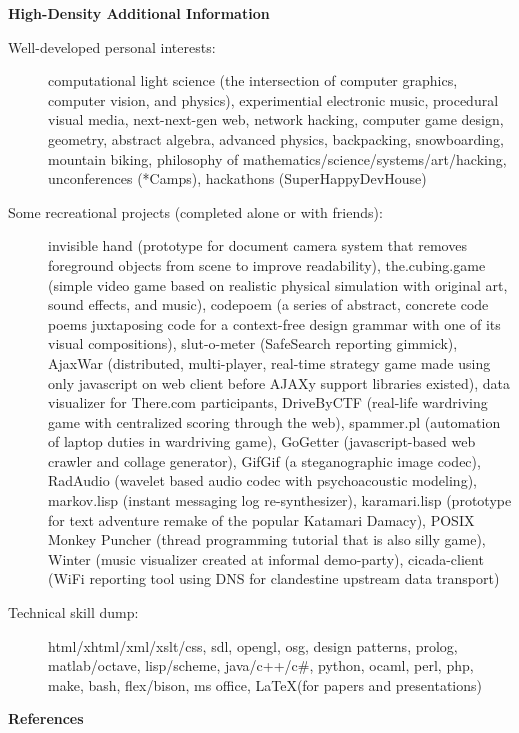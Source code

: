 \documentclass[10pt]{article}
\begin{document}
\newpage
{\large \textbf{High-Density Additional Information}}
\begin{description}
\item [Well-developed personal interests:] {\small computational light science (the intersection of computer graphics, computer vision, and physics), experimential electronic music, procedural visual media, next-next-gen web, network hacking, computer game design, geometry, abstract algebra, advanced physics, backpacking, snowboarding, mountain biking, philosophy of mathematics/science/systems/art/hacking, unconferences (*Camps), hackathons (SuperHappyDevHouse)}
\item [Some recreational projects (completed alone or with friends):] {\small invisible hand (prototype for document camera system that removes foreground objects from scene to improve readability), the.cubing.game (simple video game based on realistic physical simulation with original art, sound effects, and music), codepoem (a series of abstract, concrete code poems juxtaposing code for a context-free design grammar with one of its visual compositions), slut-o-meter (SafeSearch reporting gimmick), AjaxWar (distributed, multi-player,  real-time strategy game made using only javascript on web client before AJAXy support libraries existed), data visualizer for There.com participants, DriveByCTF (real-life wardriving game with centralized scoring through the web), spammer.pl (automation of laptop duties in wardriving game), GoGetter (javascript-based web crawler and collage generator), GifGif (a steganographic image codec), RadAudio (wavelet based audio codec with psychoacoustic modeling), markov.lisp (instant messaging log re-synthesizer), karamari.lisp (prototype for text adventure remake of the popular Katamari Damacy), POSIX Monkey Puncher (thread programming tutorial that is also silly game), Winter (music visualizer created at informal demo-party), cicada-client (WiFi reporting tool using DNS for clandestine upstream data transport)}
\item [Technical skill dump:] {\small html/xhtml/xml/xslt/css, sdl, opengl, osg, design patterns, prolog, matlab/octave, lisp/scheme, java/c++/c\#, python, ocaml, perl, php, make, bash, flex/bison, ms office, \LaTeX (for papers and presentations)}
\end{description}

{\large \textbf{References}}\\
\end{document}
